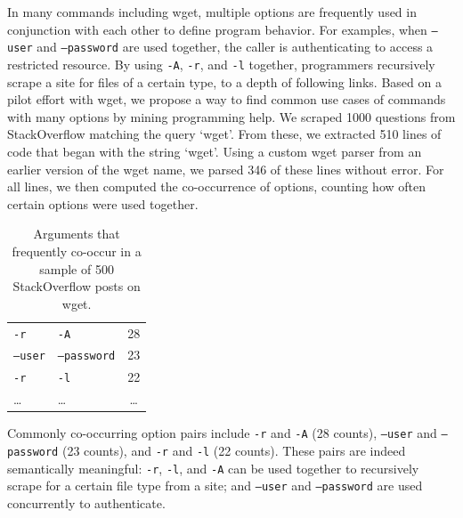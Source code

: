 In many commands including wget, multiple options are frequently used in conjunction with each other to define program behavior.
For examples, when \texttt{--user} and \texttt{--password} are used together, the caller is authenticating to access a restricted resource.
By using \texttt{-A}, \texttt{-r}, and \texttt{-l} together, programmers recursively scrape a site for files of a certain type, to a depth of following links.
\fi
Based on a pilot effort with wget, we propose a way to find common use cases of commands with many options by mining programming help.
We scraped 1000 questions from StackOverflow matching the query `wget'.
From these, we extracted 510 lines of code that began with the string `wget'.
Using a custom wget parser from an earlier version of the wget \Gls{name}, we parsed 346 of these lines without error.
For all lines, we then computed the co-occurrence of options, counting how often certain options were used together.

\begin{table}
\caption{Arguments that frequently co-occur in a sample of 500 StackOverflow posts on wget.}
\label{tab:wget_arguments}
\centering
\begin{tabular}{llc}
\toprule
\headrow{Option 1} & \headrow{Option 2} & \headrow{Count} \\
\midrule
\texttt{-r} & \texttt{-A} & 28 \\ \midrule
\texttt{--user} & \texttt{--password} & 23 \\ \midrule
\texttt{-r} & \texttt{-l} & 22 \\ \midrule
\dots & \dots & \dots \\ \bottomrule
\end{tabular}
\end{table}
\fi

\begin{changes}
Commonly co-occurring option pairs include \texttt{-r} and \texttt{-A} (28 counts), \texttt{--user} and \texttt{--password} (23 counts), and \texttt{-r} and \texttt{-l} (22 counts).
These pairs are indeed semantically meaningful:
\texttt{-r}, \texttt{-l}, and \texttt{-A} can be used together to recursively scrape for a certain file type from a site;
and \texttt{--user} and \texttt{--password} are used concurrently to authenticate.
\end{changes}

